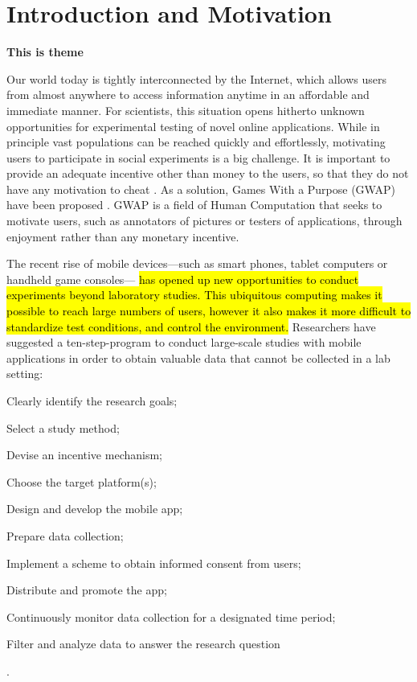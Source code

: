 \documentclass[preprint,authoryear,12pt]{elsarticle}
\newcommand{\hlc}[2][yellow]{ {\sethlcolor{#1} \hl{#2}} }
\newcommand{\theme}[1] {\par {\bfseries \color{blue} #1 \par}} %
\begin{document}
\section{Introduction and Motivation}\label{sec:intro}


\theme {This is theme}

Our world today is tightly interconnected by the Internet, which allows users from almost anywhere to access information anytime in an affordable and immediate manner. For scientists, this situation opens hitherto unknown opportunities for experimental testing of novel online applications. While in principle vast populations can  be reached quickly and effortlessly, motivating users to participate in social experiments is a big challenge. It is important to provide an adequate incentive other than money to the users, so that they do not have any motivation to cheat \citep{Quinn}.
As a solution, Games With a Purpose (GWAP) have been proposed \citep{vonAhn2006Games}. GWAP is a field of Human Computation \citep{Yuen.2009,Krause+Smeddinck.2011} that seeks to motivate users, such as annotators of pictures or testers of applications, through enjoyment rather than any monetary incentive.

The recent rise of mobile devices---such as smart phones, tablet computers or handheld game consoles---
\hlc[green]{
has opened up new opportunities to conduct experiments beyond laboratory studies. This ubiquitous computing makes it possible to reach large numbers of users, however it also makes it more difficult to standardize test conditions, and control the environment.}
Researchers have suggested a ten-step-program to conduct large-scale studies with mobile applications in order to obtain valuable data that cannot be collected in a lab setting:
\begin{inparaenum}[\itshape 1\upshape)]\item Clearly identify the research goals; \item Select a study method; \item Devise an incentive mechanism;  \item Choose the target platform(s); \item Design and develop the mobile app; \item Prepare data collection; \item Implement a scheme to obtain informed consent from users; \item Distribute and promote the app; \item Continuously monitor data collection for a designated time period; \item Filter and analyze data to answer the research question \end{inparaenum} \citep{Henze2013}.
\end{document}
